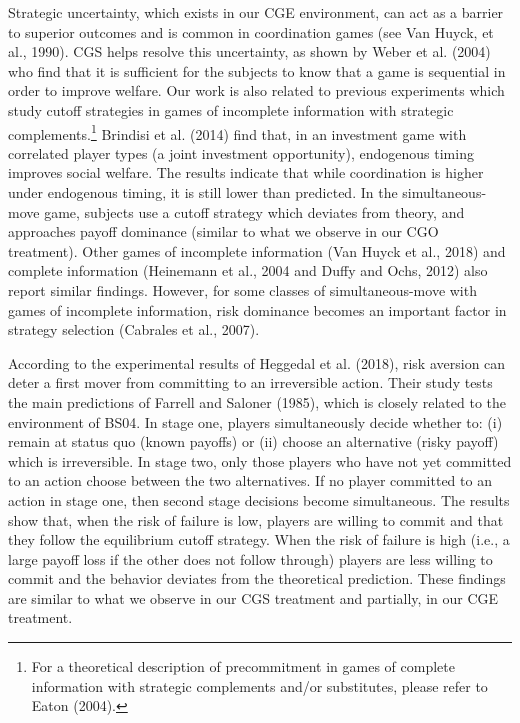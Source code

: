 \documentclass[12pt, letterpaper]{article}
\theoremstyle{plain}
\begin{document}
Strategic uncertainty, which exists in our CGE environment, can act as a barrier to superior outcomes and is common in coordination games (see Van Huyck, et al., 1990). CGS helps resolve this uncertainty, as shown by Weber et al. (2004) who find that it is sufficient for the subjects to know that a game is sequential in order to improve welfare. Our work is also related to previous experiments which study cutoff strategies in games of incomplete information with strategic complements.\footnote{For a theoretical description of precommitment in games of complete information with strategic complements and/or substitutes, please refer to Eaton (2004).} Brindisi et al. (2014) find that, in an investment game with correlated player types (a joint investment opportunity), endogenous timing improves social welfare. The results indicate that while coordination is higher under endogenous timing, it is still lower than predicted. In the simultaneous-move game, subjects use a cutoff strategy which deviates from theory, and approaches payoff dominance (similar to what we observe in our CGO treatment). Other games of incomplete information (Van Huyck et al., 2018) and complete information (Heinemann et al., 2004 and Duffy and Ochs, 2012) also report similar findings. However, for some classes of simultaneous-move with games of incomplete information, risk dominance becomes an important factor in strategy selection (Cabrales et al., 2007).

According to the experimental results of Heggedal et al. (2018), risk aversion can deter a first mover from committing to an irreversible action. Their study tests the main predictions of Farrell and Saloner (1985), which is closely related to the environment of BS04. In stage one, players simultaneously decide whether to: (i) remain at status quo (known payoffs) or (ii) choose an alternative (risky payoff) which is irreversible. In stage two, only those players who have not yet committed to an action choose between the two alternatives. If no player committed to an action in stage one, then second stage decisions become simultaneous. The results show that, when the risk of failure is low, players are willing to commit and that they follow the equilibrium cutoff strategy. When the risk of failure is high (i.e., a large payoff loss if the other does not follow through) players are less willing to commit and the behavior deviates from the theoretical prediction. These findings are similar to what we observe in our CGS treatment and partially, in our CGE treatment.
\end{document}
